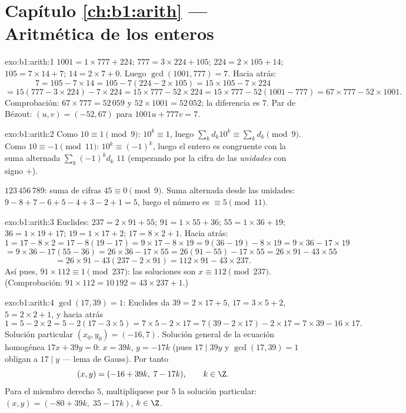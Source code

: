 \section*{Capítulo \ref{ch:b1:arith} --- Aritmética de los enteros}

\begin{solution}{exo:b1:arith:1}
$1001 = 1 \times 777 + 224$; $777 = 3 \times 224 + 105$;
$224 = 2 \times 105 + 14$; $105 = 7 \times 14 + 7$;
$14 = 2 \times 7 + 0$. Luego $\gcd(1001, 777) = 7$. Hacia atrás:
\[
7 = 105 - 7 \times 14
= 105 - 7(224 - 2\times 105) = 15 \times 105 - 7 \times 224
\]
\[
= 15(777 - 3\times 224) - 7\times 224 = 15 \times 777 - 52 \times 224
= 15 \times 777 - 52(1001 - 777) = 67 \times 777 - 52 \times 1001 .
\]
Comprobación: $67 \times 777 = 52\,059$ y $52 \times 1001 = 52\,052$;
la diferencia es $7$. Par de Bézout: $(u, v) = (-52, 67)$ para
$1001u + 777v = 7$.
\end{solution}

\begin{solution}{exo:b1:arith:2}
Como $10 \equiv 1 \pmod 9$: $10^k \equiv 1$, luego $\sum_k d_k 10^k
\equiv \sum_k d_k \pmod 9$. Como $10 \equiv -1 \pmod{11}$: $10^k
\equiv (-1)^k$, luego el entero es congruente con la suma alternada
$\sum_k (-1)^k d_k$  $11$ (empezando por la cifra de las
\emph{unidades} con signo $+$).

$123\,456\,789$: suma de cifras $45 \equiv 0 \pmod 9$. Suma alternada
desde las unidades: $9 - 8 + 7 - 6 + 5 - 4 + 3 - 2 + 1 = 5$, luego el
número es $\equiv 5 \pmod{11}$.
\end{solution}

\begin{solution}{exo:b1:arith:3}
Euclides: $237 = 2 \times 91 + 55$; $91 = 1 \times 55 + 36$;
$55 = 1 \times 36 + 19$; $36 = 1 \times 19 + 17$;
$19 = 1 \times 17 + 2$; $17 = 8 \times 2 + 1$. Hacia atrás:
\[
1 = 17 - 8\times 2 = 17 - 8(19 - 17) = 9\times 17 - 8\times 19
= 9(36 - 19) - 8\times 19 = 9\times 36 - 17\times 19
\]
\[
= 9\times 36 - 17(55 - 36) = 26\times 36 - 17\times 55
= 26(91 - 55) - 17\times 55 = 26\times 91 - 43\times 55
\]
\[
= 26\times 91 - 43(237 - 2\times 91) = 112 \times 91 - 43 \times 237.
\]
Así pues, $91 \times 112 \equiv 1 \pmod{237}$: las soluciones son
$x \equiv 112 \pmod{237}$. (Comprobación:
$91 \times 112 = 10\,192 = 43 \times 237 + 1$.)
\end{solution}

\begin{solution}{exo:b1:arith:4}
$\gcd(17, 39) = 1$: Euclides da $39 = 2\times 17 + 5$,
$17 = 3\times 5 + 2$, $5 = 2\times 2 + 1$, y hacia atrás
\[
1 = 5 - 2\times 2 = 5 - 2(17 - 3\times 5) = 7\times 5 - 2\times 17
= 7(39 - 2\times 17) - 2\times 17 = 7\times 39 - 16\times 17 .
\]
Solución particular $(x_0, y_0) = (-16, 7)$. Solución general de la
ecuación homogénea $17x + 39y = 0$: $x = 39k$, $y = -17k$ (pues
$17 \mid 39y$ y $\gcd(17,39) = 1$ obligan a $17 \mid y$ --- lema de
Gauss). Por tanto
\[
(x, y) = (-16 + 39k,\; 7 - 17k), \qquad k \in \Z .
\]
Para el miembro derecho $5$, multiplíquese por $5$ la solución
particular: $(x, y) = (-80 + 39k,\; 35 - 17k)$, $k \in \Z$.
\end{solution}

